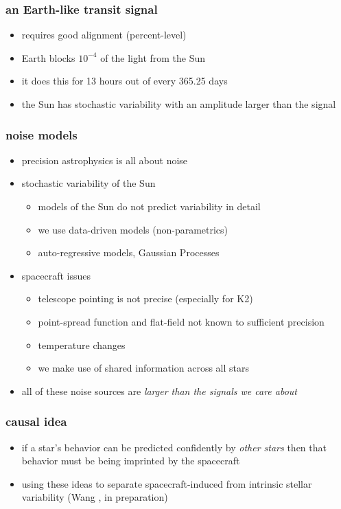 \documentclass[pdftex]{beamer}
\begin{document}
\begin{frame}
  \frametitle{an Earth-like transit signal}
  \begin{itemize}
  \item requires good alignment (percent-level)
  \item Earth blocks $10^{-4}$ of the light from the Sun
  \item it does this for 13 hours out of every 365.25 days
  \item the Sun has stochastic variability with an amplitude larger than the signal
  \end{itemize}
\end{frame}

\begin{frame}
  \frametitle{noise models}
  \begin{itemize}
  \item precision astrophysics is all about noise
  \item stochastic variability of the Sun
    \begin{itemize}
    \item models of the Sun do not predict variability in detail
    \item we use data-driven models (non-parametrics)
    \item auto-regressive models, Gaussian Processes
    \end{itemize}
  \item spacecraft issues
    \begin{itemize}
    \item telescope pointing is not precise (especially for K2)
    \item point-spread function and flat-field not known to sufficient precision
    \item temperature changes
    \item we make use of shared information across all stars
    \end{itemize}
  \item all of these noise sources are \emph{larger than the signals we care about}
  \end{itemize}
\end{frame}

\begin{frame}
  \frametitle{causal idea}
  \begin{itemize}
  \item if a star's behavior can be predicted confidently by
    \emph{other stars} then that behavior must be being imprinted by
    the spacecraft
  \item using these ideas to separate spacecraft-induced from
    intrinsic stellar variability (Wang \etal, in preparation)
  \end{itemize}
\end{frame}
\end{document}
